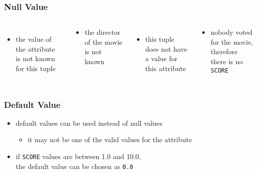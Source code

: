 \documentclass[dvipsnames]{beamer}
\theoremstyle{plain}
\begin{document}
\begin{frame}
  \frametitle{Null Value}

  \begin{columns}[t]
    \begin{itemize}
      \item the value of the attribute\\
	is not known for this tuple
    \end{itemize}

    \begin{example}
      \begin{itemize}
        \item the director of the movie\\
	  is not known
      \end{itemize}
    \end{example}

    \pause
    \begin{itemize}
      \item this tuple does not have\\
        a value for this attribute
    \end{itemize}

    \begin{example}
      \begin{itemize}
        \item nobody voted for the movie,\\
	  therefore there is no \texttt{SCORE}
      \end{itemize}
    \end{example}
  \end{columns}
\end{frame}

\begin{frame}
  \frametitle{Default Value}

  \begin{itemize}
    \item default values can be used instead of null values
    \begin{itemize}
      \item it may not be one of the valid values for the attribute
    \end{itemize}
  \end{itemize}

  \pause
  \begin{example}
    \begin{itemize}
      \item if \texttt{SCORE} values are between 1.0 and 10.0,\\
	the default value can be chosen as \texttt{0.0}
    \end{itemize}
  \end{example}
\end{frame}
\end{document}
